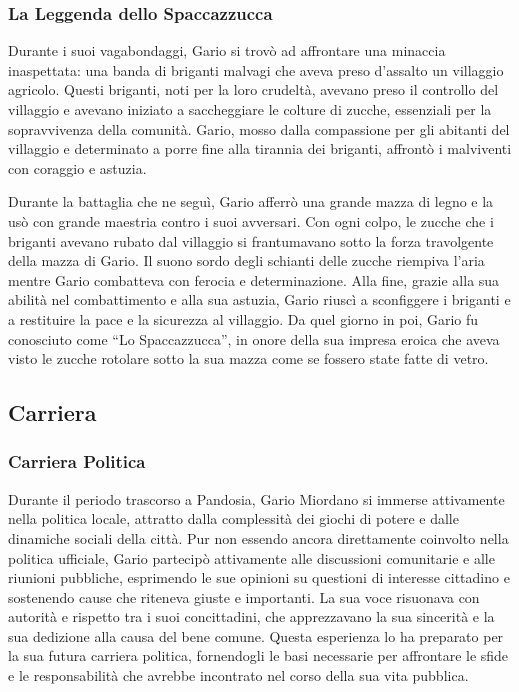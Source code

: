\subsubsection{La Leggenda dello Spaccazzucca}
Durante i suoi vagabondaggi, Gario si trovò ad affrontare una minaccia
inaspettata: una banda di briganti malvagi che aveva preso d'assalto un
villaggio agricolo. Questi briganti, noti per la loro crudeltà, avevano
preso il controllo del villaggio e avevano iniziato a saccheggiare le
colture di zucche, essenziali per la sopravvivenza della comunità.
Gario, mosso dalla compassione per gli abitanti del villaggio e
determinato a porre fine alla tirannia dei briganti, affrontò i
malviventi con coraggio e astuzia.

Durante la battaglia che ne seguì, Gario afferrò una grande mazza di
legno e la usò con grande maestria contro i suoi avversari. Con ogni
colpo, le zucche che i briganti avevano rubato dal villaggio si
frantumavano sotto la forza travolgente della mazza di Gario. Il suono
sordo degli schianti delle zucche riempiva l'aria mentre Gario
combatteva con ferocia e determinazione. Alla fine, grazie alla sua
abilità nel combattimento e alla sua astuzia, Gario riuscì a sconfiggere
i briganti e a restituire la pace e la sicurezza al villaggio. Da quel
giorno in poi, Gario fu conosciuto come ``Lo Spaccazzucca'', in onore
della sua impresa eroica che aveva visto le zucche rotolare sotto la sua
mazza come se fossero state fatte di vetro.

\subsection{Carriera}\label{carriera}


\subsubsection{Carriera Politica}\label{carriera-politica}

Durante il periodo trascorso a Pandosia, Gario Miordano si immerse
attivamente nella politica locale, attratto dalla complessità dei giochi
di potere e dalle dinamiche sociali della città. Pur non essendo ancora
direttamente coinvolto nella politica ufficiale, Gario partecipò
attivamente alle discussioni comunitarie e alle riunioni pubbliche,
esprimendo le sue opinioni su questioni di interesse cittadino e
sostenendo cause che riteneva giuste e importanti. La sua voce risuonava
con autorità e rispetto tra i suoi concittadini, che apprezzavano la sua
sincerità e la sua dedizione alla causa del bene comune. Questa
esperienza lo ha preparato per la sua futura carriera politica,
fornendogli le basi necessarie per affrontare le sfide e le
responsabilità che avrebbe incontrato nel corso della sua vita pubblica.

